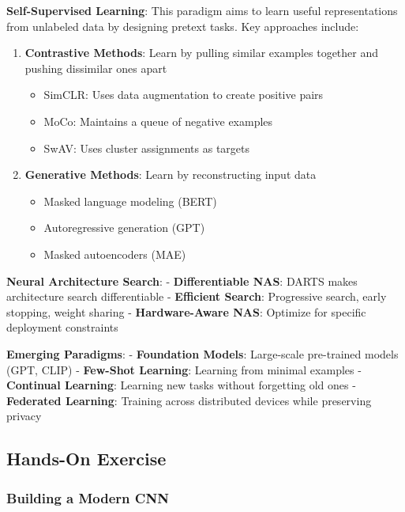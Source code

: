 \documentclass[
  11pt,
  letterpaper,
]{article}
\providecommand{\tightlist}{%
  \setlength{\itemsep}{0pt}\setlength{\parskip}{0pt}}
\begin{document}
\textbf{Self-Supervised Learning}: This paradigm aims to learn useful
representations from unlabeled data by designing pretext tasks. Key
approaches include:

\begin{enumerate}
\def\labelenumi{\arabic{enumi}.}
\tightlist
\item
  \textbf{Contrastive Methods}: Learn by pulling similar examples
  together and pushing dissimilar ones apart

  \begin{itemize}
  \tightlist
  \item
    SimCLR: Uses data augmentation to create positive pairs
  \item
    MoCo: Maintains a queue of negative examples
  \item
    SwAV: Uses cluster assignments as targets
  \end{itemize}
\item
  \textbf{Generative Methods}: Learn by reconstructing input data

  \begin{itemize}
  \tightlist
  \item
    Masked language modeling (BERT)
  \item
    Autoregressive generation (GPT)
  \item
    Masked autoencoders (MAE)
  \end{itemize}
\end{enumerate}

\textbf{Neural Architecture Search}: - \textbf{Differentiable NAS}:
DARTS makes architecture search differentiable - \textbf{Efficient
Search}: Progressive search, early stopping, weight sharing -
\textbf{Hardware-Aware NAS}: Optimize for specific deployment
constraints

\textbf{Emerging Paradigms}: - \textbf{Foundation Models}: Large-scale
pre-trained models (GPT, CLIP) - \textbf{Few-Shot Learning}: Learning
from minimal examples - \textbf{Continual Learning}: Learning new tasks
without forgetting old ones - \textbf{Federated Learning}: Training
across distributed devices while preserving privacy

\subsection{Hands-On Exercise}\label{hands-on-exercise}

\subsubsection{Building a Modern CNN}\label{building-a-modern-cnn}
\end{document}
